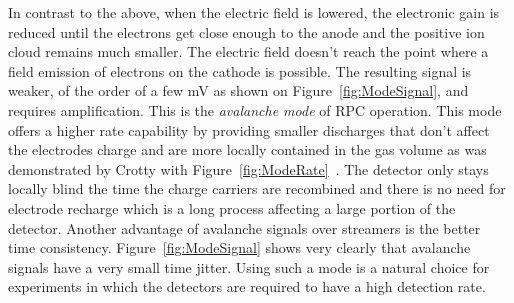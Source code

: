 	In contrast to the above, when the electric field is lowered, the electronic gain is reduced until the electrons get close enough to the anode and the positive ion cloud remains much smaller. The electric field doesn't reach the point where a field emission of electrons on the cathode is possible. The resulting signal is weaker, of the order of a few \si{mV} as shown on Figure~\ref{fig:ModeSignal}, and requires amplification. This is the \textit{avalanche mode} of RPC operation. This mode offers a higher rate capability by providing smaller discharges that don't affect the electrodes charge and are more locally contained in the gas volume as was demonstrated by Crotty with Figure~\ref{fig:ModeRate}~\cite{CROTTY93}. The detector only stays locally blind the time the charge carriers are recombined and there is no need for electrode recharge which is a long process affecting a large portion of the detector. Another advantage of avalanche signals over streamers is the better time consistency. Figure~\ref{fig:ModeSignal} shows very clearly that avalanche signals have a very small time jitter. Using such a mode is a natural choice for experiments in which the detectors are required to have a high detection rate.
	
\endgroup
	
